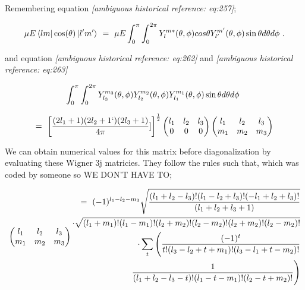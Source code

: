 \documentclass{article}
\begin{document}
Remembering equation \textit{[ambiguous historical reference: eq:257]};

\begin{equation} \label{eb-eq-270-1}
\mu E\bra{l m}\cos(\theta)\ket{l' m'} \hspace{0.125cm} = \hspace{0.125cm} \mu E \int_{0}^{\pi} \int_{0}^{2\pi} Y_{l}^{m \ast}(\theta, \phi) cos\theta Y_{l'}^{m'}(\theta, \phi) \sin\theta d\theta d\phi \hspace{0.125cm} . 
\end{equation}

and equation \textit{[ambiguous historical reference: eq:262]} and \textit{[ambiguous historical reference: eq:263]}

\begin{equation} \label{eb-eq-271-1}
\int_{0}^{\pi} \int_{0}^{2\pi} Y_{l_{3}}^{m_{3}}(\theta, \phi) Y_{l_{2}}^{m_{2}}(\theta, \phi) Y_{l_{1}}^{m_{1}}(\theta, \phi) \sin\theta d\theta d\phi \hspace{0.125cm} 
\end{equation}

\begin{equation} \label{eb-eq-272-1}
= \hspace{0.125cm} \bigg[\frac{(2 l_1 + 1)(2 l_2 + 1`)(2 l_3 + 1)}{4\pi}]\bigg]^{\frac{1}{2}}\begin{pmatrix} l_1 & l_2 & l_3 \\ 0 & 0 & 0 \end{pmatrix}\begin{pmatrix} l_1 & l_2 & l_3 \\ m_1 & m_2 & m_3 \end{pmatrix}
\end{equation}

We can obtain numerical values for this matrix before diagonalization by evaluating these Wigner 3j matricies. They follow the rules such that, which was coded by someone so WE DON'T HAVE TO; 

\begin{equation} \label{eb-eq-273-1}
\begin{pmatrix} l_1 & l_2 & l_3 \\ m_1 & m_2 & m_3 \end{pmatrix}
\begin{aligned}
= \hspace{0.125cm} (-1)^{l_1 - l_2 - m_3} \sqrt{\frac{(l_1 + l_2 - l_3)!(l_1 - l_2 + l_3)!(-l_1 + l_2 + l_3)!}{(l_1 + l_2 + l_3 + 1)}}  \\ \cdot \sqrt{(l_1 + m_1)!(l_1 - m_1)!(l_2 + m_2)!(l_2 - m_2)!(l_2 + m_2)!(l_2 - m_2)!} \\  \cdot \sum_{t} \Bigg( \frac{(-1)^{t}}{t!(l_3 - l_2 + t + m_1)!(l_3 - l_1 + t - m_2)!} \\ \frac{1}{
(l_1 + l_2 - l_3 - t)!(l_1 - t - m_1)!(l_2 - t + m_2)!} \Bigg)
\end{aligned}
\end{equation}
\end{document}
